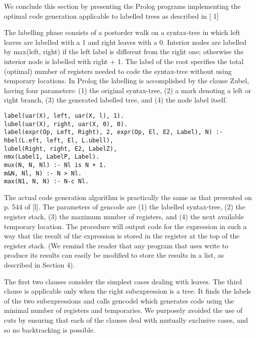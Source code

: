 \label{cohen74}

We conclude this section by presenting the Prolog programs implementing the
optimal code generation applicable to labelled trees as described in [ 1] 

The labelling phase consists of a postorder walk on a syntax-tree in which left
leaves are labelled with a 1 and right leaves with a 0. Interior nodes are labelled
by max(left, right) if the left label is different from the right one; otherwise the
interior node is labelled with right + 1. The label of the root specifies the total
(optimal) number of registers needed to code the syntax-tree without using
temporary locations. In Prolog the labelling is accomplished by the clause Zubel,
having four parameters: (1) the original syntax-tree, (2) a mark denoting a left
or right branch, (3) the generated labelled tree, and (4) the node label itself. 
\begin{verbatim}
label(uar(X), left, uar(X, l), 1).
lubel(uar(X), right, uar(X, 0), 0).
label(expr(Op, Left, Right), 2, expr(Op, El, E2, Label), N) :-
hbel(L.eft, left, El, L.ubell),
lubel(Right, right, E2, LabelZ),
nmx(Label1, LabelP, Label).
mux(N, N, Nl) :- Nl is N + 1.
m&N, Nl, N) :- N > Nl.
max(N1, N, N) :- N-c Nl. 
\end{verbatim}

The actual code generation algorithm is practically the same as that presented
on p. 544 of [l]. The parameters of gencode are (1) the labelled syntax-tree,
(2) the register stack, (3) the maximum number of registers, and (4) the next
available temporary location. The procedure will output code for the expression
in such a way that the result of the expression is stored in the register at the top
of the register stack. (We remind the reader that any program that uses write to
produce its results can easily be modified to store the results in a list, as described
in Section 4). 

The first two clauses consider the simplest cases dealing with leaves. The third
clause is applicable only when the right subexpression is a tree. It finds the labels
of the two subexpressions and calls gencodel which generates code using the
minimal number of registers and temporaries. We purposely avoided the use of
cuts by ensuring that each of the clauses deal with mutually exclusive cases, and
so no backtracking is possible. 

